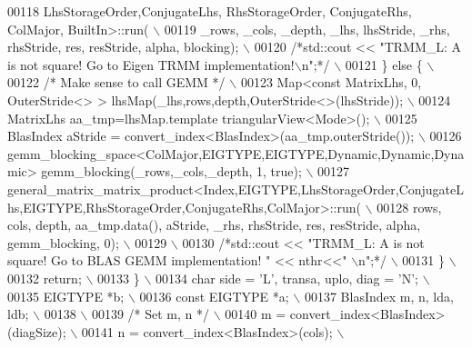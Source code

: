 \begin{DoxyCode}
00118 \textcolor{preprocessor}{       LhsStorageOrder,ConjugateLhs, RhsStorageOrder, ConjugateRhs, ColMajor, BuiltIn>::run( \(\backslash\)}
00119 \textcolor{preprocessor}{           \_rows, \_cols, \_depth, \_lhs, lhsStride, \_rhs, rhsStride, res, resStride, alpha, blocking); \(\backslash\)}
00120 \textcolor{preprocessor}{     }\textcolor{comment}{/*std::cout << "TRMM\_L: A is not square! Go to Eigen TRMM implementation!\(\backslash\)n";*/}\textcolor{preprocessor}{ \(\backslash\)}
00121 \textcolor{preprocessor}{     \} else \{ \(\backslash\)}
00122 \textcolor{preprocessor}{     }\textcolor{comment}{/* Make sense to call GEMM */}\textcolor{preprocessor}{ \(\backslash\)}
00123 \textcolor{preprocessor}{       Map<const MatrixLhs, 0, OuterStride<> > lhsMap(\_lhs,rows,depth,OuterStride<>(lhsStride)); \(\backslash\)}
00124 \textcolor{preprocessor}{       MatrixLhs aa\_tmp=lhsMap.template triangularView<Mode>(); \(\backslash\)}
00125 \textcolor{preprocessor}{       BlasIndex aStride = convert\_index<BlasIndex>(aa\_tmp.outerStride()); \(\backslash\)}
00126 \textcolor{preprocessor}{       gemm\_blocking\_space<ColMajor,EIGTYPE,EIGTYPE,Dynamic,Dynamic,Dynamic>
       gemm\_blocking(\_rows,\_cols,\_depth, 1, true); \(\backslash\)}
00127 \textcolor{preprocessor}{      
       general\_matrix\_matrix\_product<Index,EIGTYPE,LhsStorageOrder,ConjugateLhs,EIGTYPE,RhsStorageOrder,ConjugateRhs,ColMajor>::run( \(\backslash\)}
00128 \textcolor{preprocessor}{       rows, cols, depth, aa\_tmp.data(), aStride, \_rhs, rhsStride, res, resStride, alpha, gemm\_blocking,
       0); \(\backslash\)}
00129 \textcolor{preprocessor}{\(\backslash\)}
00130 \textcolor{preprocessor}{     }\textcolor{comment}{/*std::cout << "TRMM\_L: A is not square! Go to BLAS GEMM implementation! " << nthr<<" \(\backslash\)n";*/}\textcolor{preprocessor}{ \(\backslash\)}
00131 \textcolor{preprocessor}{     \} \(\backslash\)}
00132 \textcolor{preprocessor}{     return; \(\backslash\)}
00133 \textcolor{preprocessor}{   \} \(\backslash\)}
00134 \textcolor{preprocessor}{   char side = 'L', transa, uplo, diag = 'N'; \(\backslash\)}
00135 \textcolor{preprocessor}{   EIGTYPE *b; \(\backslash\)}
00136 \textcolor{preprocessor}{   const EIGTYPE *a; \(\backslash\)}
00137 \textcolor{preprocessor}{   BlasIndex m, n, lda, ldb; \(\backslash\)}
00138 \textcolor{preprocessor}{\(\backslash\)}
00139 \textcolor{preprocessor}{}\textcolor{comment}{/* Set m, n */}\textcolor{preprocessor}{ \(\backslash\)}
00140 \textcolor{preprocessor}{   m = convert\_index<BlasIndex>(diagSize); \(\backslash\)}
00141 \textcolor{preprocessor}{   n = convert\_index<BlasIndex>(cols); \(\backslash\)}

\end{DoxyCode}
